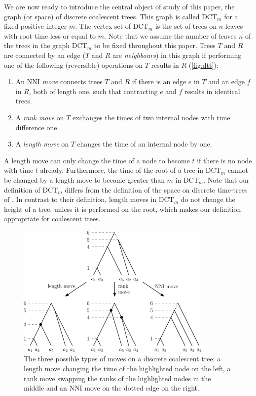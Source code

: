 \documentclass[11pt]{amsart}
\newcommand{\rnni}{\mathrm{RNNI}}
\newcommand{\nni}{\mathrm{NNI}}
\newcommand{\dct}{\mathrm{DCT}}
\newcommand{\summary}[1]{} %
\begin{document}
\summary{Defining the tree space $\dct_m$ and $\rnni = \dct_{n-1}$}
We are now ready to introduce the central object of study of this paper, the graph (or space) of discrete coalescent trees.
This graph is called $\dct_m$ for a fixed positive integer $m$.
The vertex set of $\dct_m$ is the set of trees on $n$ leaves with root time less or equal to $m$.
Note that we assume the number of leaves $n$ of the trees in the graph $\dct_m$ to be fixed throughout this paper.
Trees $T$ and $R$ are connected by an edge ($T$ and $R$ are \emph{neighbours}) in this graph if performing one of the following (reversible) operations on $T$ results in $R$ (\autoref{fig:dtt}):
\begin{enumerate}
	\item An \emph{$\nni$ move} connects trees $T$ and $R$ if there is an edge $e$ in $T$ and an edge $f$ in $R$, both of length one, such that contracting $e$ and $f$ results in identical trees.
	\item A \emph{rank move} on $T$ exchanges the times of two internal nodes with time difference one.
	\item A \emph{length move} on $T$ changes the time of an internal node by one.
\end{enumerate}
A length move can only change the time of a node to become $t$ if there is no node with time $t$ already.
Furthermore, the time of the root of a tree in $\dct_m$ cannot be changed by a length move to become greater than $m$ in $\dct_m$.
Note that our definition of $\dct_m$ differs from the definition of the space on discrete time-trees of \textcite{Gavryushkin2018-ol}.
In contrast to their definition, length moves in $\dct_m$ do not change the height of a tree, unless it is performed on the root, which makes our definition appropriate for coalescent trees.

\begin{figure}[ht]
	\includegraphics[width=0.85\textwidth]{dtt.eps}
	\caption{The three possible types of moves on a discrete coalescent tree: a length move changing the time of the highlighted node on the left, a rank move swapping the ranks of the highlighted nodes 	in the middle and an $\nni$ move on the dotted edge on the right.}
	\label{fig:dtt}
\end{figure}
\end{document}
